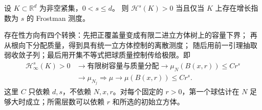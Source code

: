 \begin{theorem}[Frostman]\label{b1:thm:frostman}
设 \(K\subset\mathbb R^d\) 为非空紧集，\(0<s\leq d\)。
则 \(\mathcal H^s(K)>0\) 当且仅当 \(K\) 上存在增长指数为 \(s\) 的 Frostman 测度。
\end{theorem}
存在性方向有四个转换：先把正覆盖量变成有限二进立方体树上的容量下界；
再从根向下分配质量，得到具有统一立方体控制的离散测度；
随后用前一引理抽取弱收敛子列；最后用开集不等式把球质量控制传给极限。即
\[
 \begin{aligned}
 \mathcal H^s_\infty(K)>0
 &\longrightarrow \text{有限树容量与质量分配}
 \longrightarrow \mu_N(B(x,r))\leq C r^s\\
 &\longrightarrow \mu_{N_j}\Rightarrow\mu
 \longrightarrow \mu(B(x,r))\leq C r^s.
 \end{aligned}
\]
这里 \(C\) 只依赖 \(d,s\)，不依赖 \(N,x,r\)。对每个固定的 \(r>0\)，第一个球估计在 \(N\) 足够大时成立；所需层数可以依赖 \(r\) 和所选的初始立方体。
